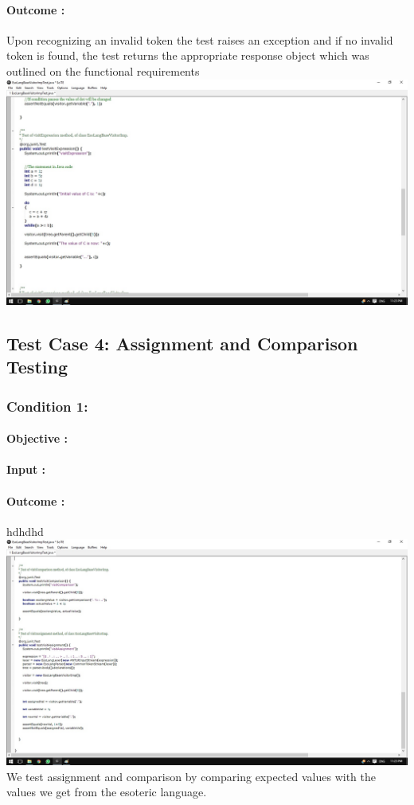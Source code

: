 \documentclass[english]{article}
\begin{document}
			\paragraph{Outcome :} Upon recognizing an invalid token the test raises an exception and if no invalid token is found, the test returns the  appropriate response object  which was outlined on the functional requirements  \\
				
			\includegraphics[width=\linewidth]{test3.jpg}
			\\[12pt]		
		 	
			\subsection{Test Case 4: Assignment and Comparison Testing}
			\subsubsection{Condition 1: }
			\paragraph{Objective :}
			\paragraph{Input :}
			\paragraph{Outcome :}hdhdhd\\
			\includegraphics[width=\linewidth]{test4.jpg}
			\\[12pt]
			We test assignment and comparison by comparing expected values with the values we get from the esoteric language.	
	
\end{document}
